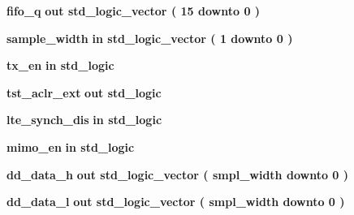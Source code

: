 \begin{DoxyCompactItemize}
{\bf fifo\+\_\+q}  {\bfseries {\bfseries \textcolor{keywordflow}{out}\textcolor{vhdlchar}{ }}} {\bfseries \textcolor{comment}{std\+\_\+logic\+\_\+vector}\textcolor{vhdlchar}{ }\textcolor{vhdlchar}{(}\textcolor{vhdlchar}{ }\textcolor{vhdlchar}{ } \textcolor{vhdldigit}{15} \textcolor{vhdlchar}{ }\textcolor{keywordflow}{downto}\textcolor{vhdlchar}{ }\textcolor{vhdlchar}{ } \textcolor{vhdldigit}{0} \textcolor{vhdlchar}{ }\textcolor{vhdlchar}{)}\textcolor{vhdlchar}{ }} 
\item 
{\bf sample\+\_\+width}  {\bfseries {\bfseries \textcolor{keywordflow}{in}\textcolor{vhdlchar}{ }}} {\bfseries \textcolor{comment}{std\+\_\+logic\+\_\+vector}\textcolor{vhdlchar}{ }\textcolor{vhdlchar}{(}\textcolor{vhdlchar}{ }\textcolor{vhdlchar}{ } \textcolor{vhdldigit}{1} \textcolor{vhdlchar}{ }\textcolor{keywordflow}{downto}\textcolor{vhdlchar}{ }\textcolor{vhdlchar}{ } \textcolor{vhdldigit}{0} \textcolor{vhdlchar}{ }\textcolor{vhdlchar}{)}\textcolor{vhdlchar}{ }} 
\item 
{\bf tx\+\_\+en}  {\bfseries {\bfseries \textcolor{keywordflow}{in}\textcolor{vhdlchar}{ }}} {\bfseries \textcolor{comment}{std\+\_\+logic}\textcolor{vhdlchar}{ }} 
\item 
{\bf tst\+\_\+aclr\+\_\+ext}  {\bfseries {\bfseries \textcolor{keywordflow}{out}\textcolor{vhdlchar}{ }}} {\bfseries \textcolor{comment}{std\+\_\+logic}\textcolor{vhdlchar}{ }} 
\item 
{\bf lte\+\_\+synch\+\_\+dis}  {\bfseries {\bfseries \textcolor{keywordflow}{in}\textcolor{vhdlchar}{ }}} {\bfseries \textcolor{comment}{std\+\_\+logic}\textcolor{vhdlchar}{ }} 
\item 
{\bf mimo\+\_\+en}  {\bfseries {\bfseries \textcolor{keywordflow}{in}\textcolor{vhdlchar}{ }}} {\bfseries \textcolor{comment}{std\+\_\+logic}\textcolor{vhdlchar}{ }} 
\item 
{\bf dd\+\_\+data\+\_\+h}  {\bfseries {\bfseries \textcolor{keywordflow}{out}\textcolor{vhdlchar}{ }}} {\bfseries \textcolor{comment}{std\+\_\+logic\+\_\+vector}\textcolor{vhdlchar}{ }\textcolor{vhdlchar}{(}\textcolor{vhdlchar}{ }\textcolor{vhdlchar}{ }\textcolor{vhdlchar}{ }\textcolor{vhdlchar}{ }{\bfseries {\bf smpl\+\_\+width}} \textcolor{vhdlchar}{ }\textcolor{keywordflow}{downto}\textcolor{vhdlchar}{ }\textcolor{vhdlchar}{ } \textcolor{vhdldigit}{0} \textcolor{vhdlchar}{ }\textcolor{vhdlchar}{)}\textcolor{vhdlchar}{ }} 
\item 
{\bf dd\+\_\+data\+\_\+l}  {\bfseries {\bfseries \textcolor{keywordflow}{out}\textcolor{vhdlchar}{ }}} {\bfseries \textcolor{comment}{std\+\_\+logic\+\_\+vector}\textcolor{vhdlchar}{ }\textcolor{vhdlchar}{(}\textcolor{vhdlchar}{ }\textcolor{vhdlchar}{ }\textcolor{vhdlchar}{ }\textcolor{vhdlchar}{ }{\bfseries {\bf smpl\+\_\+width}} \textcolor{vhdlchar}{ }\textcolor{keywordflow}{downto}\textcolor{vhdlchar}{ }\textcolor{vhdlchar}{ } \textcolor{vhdldigit}{0} \textcolor{vhdlchar}{ }\textcolor{vhdlchar}{)}\textcolor{vhdlchar}{ }} 

\end{DoxyCompactItemize}
